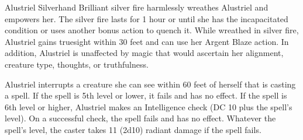 \documentclass[10pt,a4paper,twoside,bg=print,twocolumn,openany,nodeprecatedcode]{dndbook}
\begin{document}
\begin{DndMonster}[float=t]{Alustriel Silverhand}
Brilliant silver fire harmlessly wreathes Alustriel and empowers her. The silver fire lasts for 1 hour or until she has the incapacitated condition or uses another bonus action to quench it. While wreathed in silver fire, Alustriel gains truesight within 30 feet and can use her Argent Blaze action. In addition, Alustriel is unaffected by magic that would ascertain her alignment, creature type, thoughts, or truthfulness.

Alustriel interrupts a creature she can see within 60 feet of herself that is casting a spell. If the spell is 5th level or lower, it fails and has no effect. If the spell is 6th level or higher, Alustriel makes an Intelligence check (DC 10 plus the spell's level). On a successful check, the spell fails and has no effect. Whatever the spell's level, the caster takes 11 (2d10) radiant damage if the spell fails.

\end{DndMonster}
\end{document}
